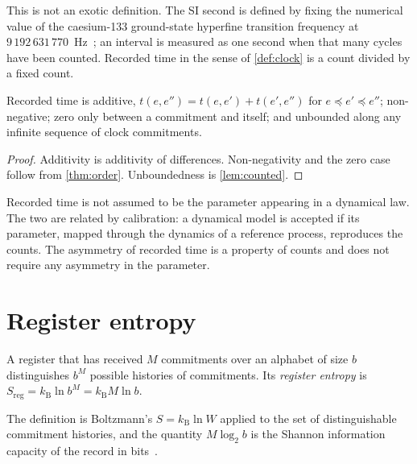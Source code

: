 \documentclass[10pt,twocolumn,a4paper]{article}
\newcommand{\kB}{k_{\mathrm{B}}}
\begin{document}
This is not an exotic definition. The SI second is defined by fixing the
numerical value of the caesium-133 ground-state hyperfine transition
frequency at $9\,192\,631\,770$~Hz~\citep{bipm2019}; an interval is measured
as one second when that many cycles have been counted. Recorded time in the
sense of \cref{def:clock} is a count divided by a fixed count.

\begin{proposition}
\label{prop:time}
Recorded time is additive, $t(e,e'')=t(e,e')+t(e',e'')$ for $e\preceq
e'\preceq e''$; non-negative; zero only between a commitment and itself; and
unbounded along any infinite sequence of clock commitments.
\end{proposition}

\begin{proof}
Additivity is additivity of differences. Non-negativity and the zero case
follow from \cref{thm:order}. Unboundedness is \cref{lem:counted}.
\end{proof}

\begin{remark}
\label{rem:parameter}
Recorded time is not assumed to be the parameter appearing in a dynamical
law. The two are related by calibration: a dynamical model is accepted if its
parameter, mapped through the dynamics of a reference process, reproduces
the counts. The asymmetry of recorded time is a property of counts and does
not require any asymmetry in the parameter.
\end{remark}

\section{Register entropy}
\label{sec:entropy}

\begin{definition}
\label{def:regent}
A register that has received $M$ commitments over an alphabet of size $b$
distinguishes $b^M$ possible histories of commitments. Its \emph{register
entropy} is $S_{\mathrm{reg}}=\kB\ln b^M=\kB M\ln b$.
\end{definition}

The definition is Boltzmann's $S=\kB\ln W$ applied to the set of
distinguishable commitment histories, and the quantity $M\log_2 b$ is the
Shannon information capacity of the record in bits~\citep{shannon1948}.
\end{document}
